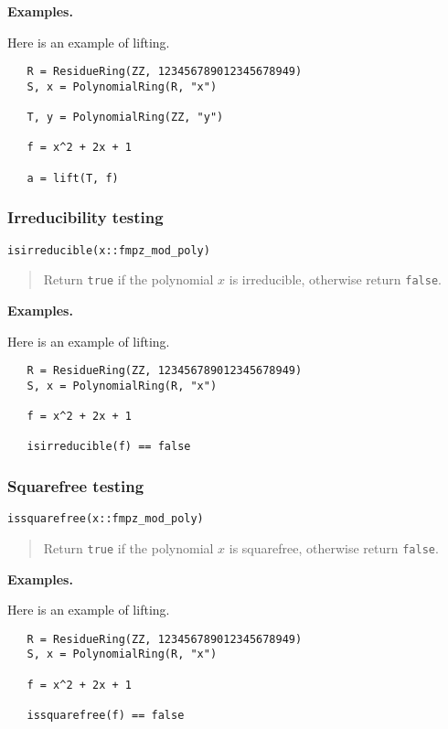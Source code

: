 \documentclass[a4paper,10pt]{article}
\newcommand{\code}{\lstinline}
\newcommand{\desc}[1]{\vspace{-3mm}\begin{quote}#1\end{quote}}
\begin{document}
{{\textbf{Examples.}

Here is an example of lifting.

\begin{lstlisting}
   R = ResidueRing(ZZ, 123456789012345678949)
   S, x = PolynomialRing(R, "x")

   T, y = PolynomialRing(ZZ, "y")

   f = x^2 + 2x + 1

   a = lift(T, f) 
\end{lstlisting}

\subsubsection{Irreducibility testing}

\begin{lstlisting}
isirreducible(x::fmpz_mod_poly)
\end{lstlisting}

\desc{Return \code{true} if the polynomial $x$ is irreducible, otherwise return \code{false}.}

\textbf{Examples.}

Here is an example of lifting.

\begin{lstlisting}
   R = ResidueRing(ZZ, 123456789012345678949)
   S, x = PolynomialRing(R, "x")

   f = x^2 + 2x + 1

   isirreducible(f) == false
\end{lstlisting}

\subsubsection{Squarefree testing}

\begin{lstlisting}
issquarefree(x::fmpz_mod_poly)
\end{lstlisting}

\desc{Return \code{true} if the polynomial $x$ is squarefree, otherwise return \code{false}.}

\textbf{Examples.}

Here is an example of lifting.

\begin{lstlisting}
   R = ResidueRing(ZZ, 123456789012345678949)
   S, x = PolynomialRing(R, "x")

   f = x^2 + 2x + 1

   issquarefree(f) == false
\end{lstlisting}

}}
\end{document}
